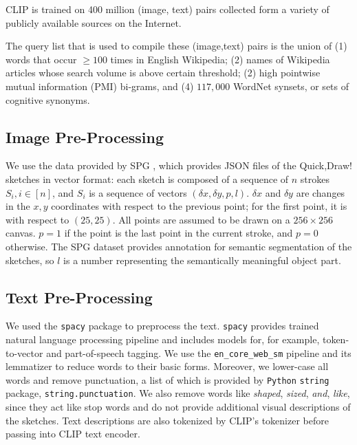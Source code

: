 CLIP is trained on 400 million (image, text) pairs collected form a variety of publicly available sources on the Internet.

The query list that is used to compile these (image,text) pairs is the union of (1) words that occur $\geq 100$ times in English Wikipedia; (2) names of Wikipedia articles whose search volume is above certain threshold; (2) high pointwise mutual information (PMI) bi-grams, and (4) $117,000$ WordNet synsets, or sets of cognitive synonyms. 

\subsection{Image Pre-Processing}
We use the data provided by SPG \citep{spg_paper}, which provides JSON files of the Quick,Draw! sketches in vector format: each sketch is composed of a sequence of $n$ strokes $S_i, i \in [n]$, and $S_i$ is a sequence of vectors $(\delta x,\delta y, p, l)$. $\delta x$ and $\delta y$ are changes in the $x,y$ coordinates with respect to the previous point; for the first point, it is with respect to $(25,25)$. All points are assumed to be drawn on a $256 \times 256$ canvas. $p=1$ if the point is the last point in the current stroke, and $p=0$ otherwise. The SPG dataset provides annotation for semantic segmentation of the sketches, so $l$ is a number representing the semantically meaningful object part.  


\subsection{Text Pre-Processing}
We used the \texttt{spacy} package to preprocess the text. \texttt{spacy} provides trained natural language processing pipeline and includes models for, for example, token-to-vector and part-of-speech tagging. We use the \texttt{en\_core\_web\_sm} pipeline and its lemmatizer to reduce words to their basic forms. Moreover, we lower-case all words and remove punctuation, a list of which is provided by \texttt{Python} \texttt{string} package, \texttt{string.punctuation}. We also remove words like \textit{shaped}, \textit{sized}, \textit{and}, \textit{like}, since they act like stop words and do not provide additional visual descriptions of the sketches. Text descriptions are also tokenized by CLIP's tokenizer before passing into CLIP text encoder.     

